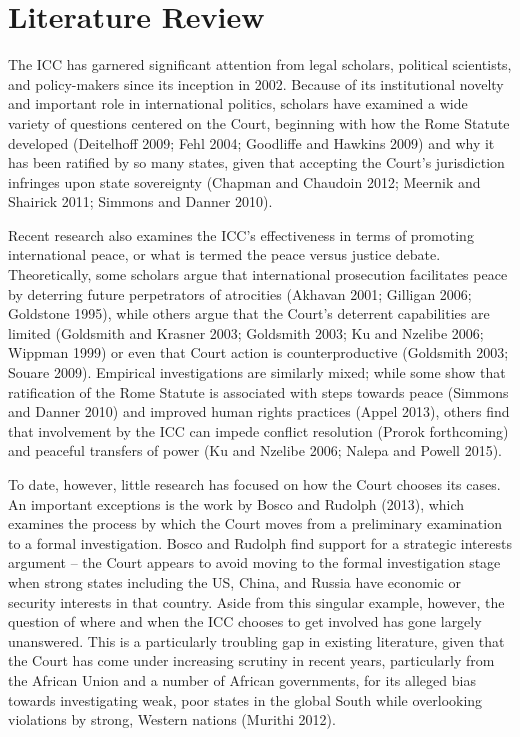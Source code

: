 \section*{Literature Review}

The ICC has garnered significant attention from legal scholars, political scientists, and policy-makers since its inception in 2002. Because of its institutional novelty and important role in international politics, scholars have examined a wide variety of questions centered on the Court, beginning with how the Rome Statute developed (Deitelhoff 2009; Fehl 2004; Goodliffe and Hawkins 2009) and why it has been ratified by so many states, given that accepting the Court’s jurisdiction infringes upon state sovereignty (Chapman and Chaudoin 2012; Meernik and Shairick 2011; Simmons and Danner 2010). 

Recent research also examines the ICC’s effectiveness in terms of promoting international peace, or what is termed the peace versus justice debate. Theoretically, some scholars argue that international prosecution facilitates peace by deterring future perpetrators of atrocities (Akhavan 2001; Gilligan 2006; Goldstone 1995), while others argue that the Court’s deterrent capabilities are limited (Goldsmith and Krasner 2003; Goldsmith 2003; Ku and Nzelibe 2006; Wippman 1999) or even that Court action is counterproductive (Goldsmith 2003; Souare 2009). Empirical investigations are similarly mixed; while some show that ratification of the Rome Statute is associated with steps towards peace (Simmons and Danner 2010) and improved human rights practices (Appel 2013), others find that involvement by the ICC can impede conflict resolution (Prorok forthcoming) and peaceful transfers of power (Ku and Nzelibe 2006; Nalepa and Powell 2015).

To date, however, little research has focused on how the Court chooses its cases. An important exceptions is the work by Bosco and Rudolph (2013), which examines the process by which the Court moves from a preliminary examination to a formal investigation.  Bosco and Rudolph find support for a strategic interests argument – the Court appears to avoid moving to the formal investigation stage when strong states including the US, China, and Russia have economic or security interests in that country. Aside from this singular example, however, the question of where and when the ICC chooses to get involved has gone largely unanswered.  This is a particularly troubling gap in existing literature, given that the Court has come under increasing scrutiny in recent years, particularly from the African Union and a number of African governments, for its alleged bias towards investigating weak, poor states in the global South while overlooking violations by strong, Western nations (Murithi 2012).  

